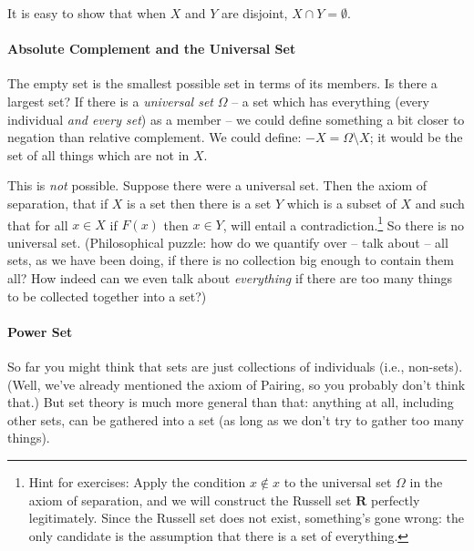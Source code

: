  It is easy to show that when $X$ and $Y$ are disjoint, $X \cap Y = \emptyset$.

\paragraph{Absolute Complement and the Universal Set}

The empty set is the smallest possible set in terms of its members. Is there a largest set? If there is a \emph{universal set} $\Omega$ – a set which has everything (every individual \emph{and every set}) as a member – we could define something a bit closer to negation than relative complement. We could define: $-X = \Omega \setminus X$; it would be the set of all things which are not in $X$.

This is \emph{not} possible. Suppose there were a universal set. Then the axiom of separation, that if $X$ is a set then there is a set $Y$ which is a subset of $X$ and such that for all $x\in X$ if $F(x)$ then $x\in Y$, will entail a contradiction.\footnote{Hint for exercises: Apply the condition $x\notin x$ to the universal set $\Omega$ in the axiom of separation, and we will construct the Russell set $\mathbf{R}$ perfectly legitimately. Since the Russell set does not exist, something's gone wrong: the only candidate is the assumption that there is a set of everything.} So there is no universal set. (Philosophical puzzle: how do we quantify over – talk about – all sets, as we have been doing, if there is no collection big enough to contain them all? How indeed can we even talk about \emph{everything} if there are too many things to be collected together into a set?) 

\paragraph{Power Set}

So far you might think that sets are just collections of individuals (i.e., non-sets). (Well, we've already mentioned the axiom of Pairing, so you probably don't think that.) But set theory is much more general than that: anything at all, including other sets, can be gathered into a set (as long as we don't try to gather too many things).

